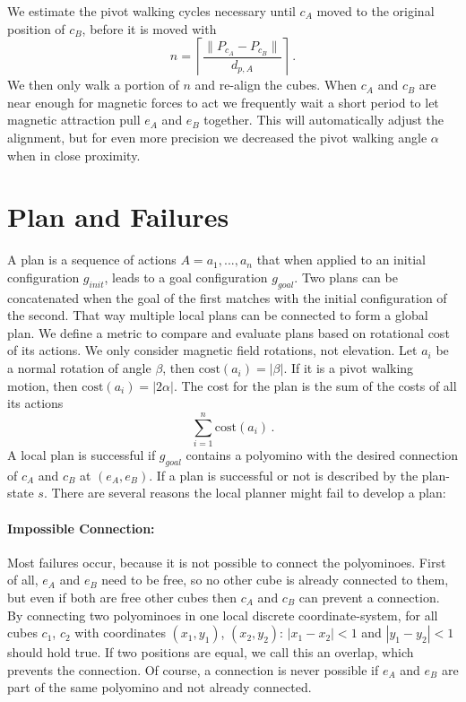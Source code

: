 We estimate the pivot walking cycles necessary until $c_A$ moved to the original position of $c_B$, before it is moved with
\begin{equation}
n = \left\lceil \frac{\lVert P_{c_A} - P_{c_B}\rVert}{d_{p,A}} \right\rceil \,.
\end{equation}
We then only walk a portion of $n$ and re-align the cubes.
When $c_A$ and $c_B$ are near enough for magnetic forces to act we frequently wait a short period to let magnetic attraction pull $e_A$ and $e_B$ together.
This will automatically adjust the alignment, but for even more precision we decreased the pivot walking angle $\alpha$ when in close proximity.

\section{Plan and Failures}
\label{sec:plan}

A plan is a sequence of actions $A = a_1, ... , a_n$ that when applied to an initial configuration $g_{init}$, leads to a goal configuration $g_{goal}$.
Two plans can be concatenated when the goal of the first matches with the initial configuration of the second.
That way multiple local plans can be connected to form a global plan.
We define a metric to compare and evaluate plans based on rotational cost of its actions.
We only consider magnetic field rotations, not elevation.
Let $a_i$ be a normal rotation of angle $\beta$, then $\text{cost}(a_i) = |\beta|$.
If it is a pivot walking motion, then $\text{cost}(a_i) = |2\alpha|$.
The cost for the plan is the sum of the costs of all its actions
\begin{equation}
\sum_{i=1}^{n} \text{cost}(a_i) \,.
\end{equation}
A local plan is successful if $g_{goal}$ contains a polyomino with the desired connection of $c_A$ and $c_B$ at $(e_A, e_B)$.
If a plan is successful or not is described by the plan-state $s$.
There are several reasons the local planner might fail to develop a plan:

\paragraph{Impossible Connection:}

Most failures occur, because it is not possible to connect the polyominoes.
First of all, $e_A$ and $e_B$ need to be free, so no other cube is already connected to them, but even if both are free other cubes then $c_A$ and $c_B$ can prevent a connection.
By connecting two polyominoes in one local discrete coordinate-system, for all cubes $c_1$, $c_2$ with coordinates $(x_1, y_1)$, $(x_2, y_2)$: $\left|x_1 - x_2\right| < 1$ and $\left|y_1 - y_2\right| < 1$ should hold true.
If two positions are equal, we call this an overlap, which prevents the connection.
Of course, a connection is never possible if $e_A$ and $e_B$ are part of the same polyomino and not already connected.

